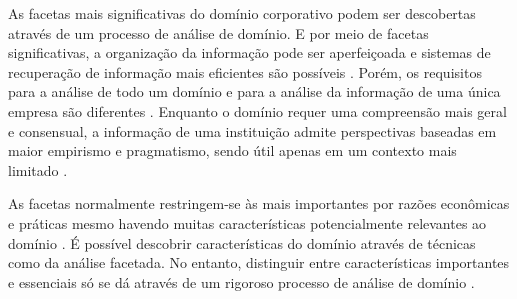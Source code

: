 

As facetas mais significativas do domínio corporativo podem ser descobertas através de um processo de análise de domínio. E por meio de facetas significativas, a organização da informação pode ser aperfeiçoada e sistemas de recuperação de informação mais eficientes são possíveis \cite{albrechtsen1993subject}. Porém, os requisitos para a análise de todo um domínio e para a análise da informação de uma única empresa são diferentes \cite{gopinath92}. Enquanto o domínio requer uma compreensão mais geral e consensual, a informação de uma instituição admite perspectivas baseadas em maior empirismo e pragmatismo, sendo útil apenas em um contexto mais limitado \cite{hjorland2002domain}.

As facetas normalmente restringem-se às mais importantes por razões econômicas e práticas mesmo havendo muitas características potencialmente relevantes ao domínio \cite{ranganathan1967}. É possível descobrir características do domínio através de técnicas como da análise facetada. No entanto, distinguir entre características importantes e essenciais só se dá através de um rigoroso processo de análise de domínio \cite{lykke2011domain}.

